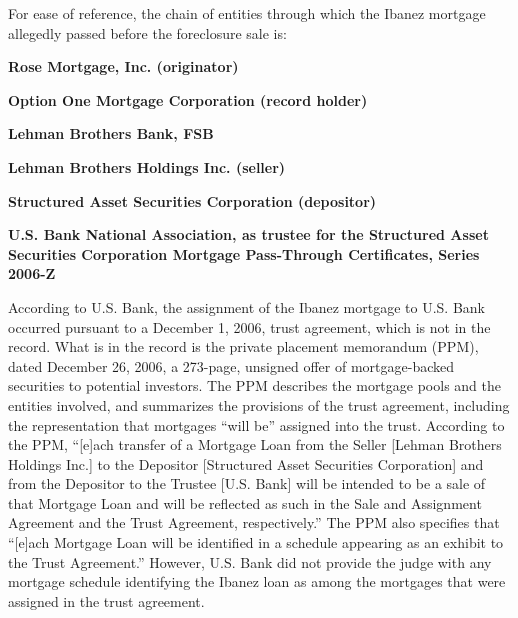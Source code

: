 For ease of reference, the chain of entities through which the Ibanez mortgage
allegedly passed before the foreclosure sale is:
\begin{center}
\textbf{Rose Mortgage, Inc. (originator)}

\textdownarrow

\textbf{Option One Mortgage Corporation (record holder)}

\textdownarrow

\textbf{Lehman Brothers Bank, FSB}

\textdownarrow

\textbf{Lehman Brothers Holdings Inc. (seller)}

\textdownarrow

\textbf{Structured Asset Securities Corporation (depositor)}

\textdownarrow

\textbf{U.S. Bank National Association, as trustee for the Structured Asset
Securities Corporation Mortgage Pass-Through Certificates, Series 2006-Z}
\end{center}
According to U.S. Bank, the assignment of the Ibanez mortgage to U.S. Bank
occurred pursuant to a December 1, 2006, trust agreement, which is not in the
record. What is in the record is the private placement memorandum (PPM), dated
December 26, 2006, a 273-page, unsigned offer of mortgage-backed securities to
potential investors. The PPM describes the mortgage pools and the entities
involved, and summarizes the provisions of the trust agreement, including the
representation that mortgages ``will be'' assigned into the trust. According to
the PPM, ``[e]ach transfer of a Mortgage Loan from the Seller [Lehman Brothers
Holdings Inc.] to the Depositor [Structured Asset Securities Corporation] and
from the Depositor to the Trustee [U.S. Bank] will be intended to be a sale of
that Mortgage Loan and will be reflected as such in the Sale and Assignment
Agreement and the Trust Agreement, respectively.'' The PPM also specifies that
``[e]ach Mortgage Loan will be identified in a schedule appearing as an exhibit
to the Trust Agreement.'' However, U.S. Bank did not provide the judge with any
mortgage schedule identifying the Ibanez loan as among the mortgages that were
assigned in the trust agreement.

